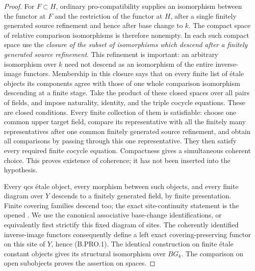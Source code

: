 \documentclass[11pt,a4paper]{article}
\begin{document}
\begin{proof}
For \(F\subset H\), ordinary pro-compatibility supplies an
isomorphism between the functor at \(F\) and the restriction of
the functor at \(H\), after a single finitely generated source
refinement and hence after base change to \(k\). The compact
space of relative comparison isomorphisms is therefore nonempty.
In each such compact space use the \emph{closure of the subset
of isomorphisms which descend after a finitely generated source
refinement}. This refinement is important: an arbitrary isomorphism
over \(k\) need not descend as an isomorphism of the entire
inverse-image functors. Membership in this closure says that on
every finite list of étale objects its components agree with those
of one whole comparison isomorphism descending at a finite stage.
Take the product of these closed spaces over all pairs of fields, and
impose naturality, identity, and the triple cocycle equations.
These are closed conditions. Every finite collection of them is
satisfiable: choose one common upper target field, compare its
representative with all the finitely many representatives after
one common finitely generated source refinement, and obtain all
comparisons by passing through this one representative. They
then satisfy every required finite cocycle equation. Compactness
gives a simultaneous coherent choice. This proves existence of
coherence; it has not been inserted into the hypothesis.

Every qcs étale object, every morphism between such objects, and
every finite diagram over \(Y\) descends to a finitely generated
field, by finite presentation. Finite covering families descend
too; the exact site-continuity statement is the opened
\citep[Lemma~59.51.2, Tag~0EYL, together with
Lemma~32.10.1, Tag~01ZM]{StacksProject}. We use the canonical
associative base-change identifications, or equivalently first
strictify this fixed diagram of sites. The coherently identified
inverse-image functors consequently
define a left exact covering-preserving functor on this site of
\(Y\), hence (B.PRO.1). The identical construction on finite étale
constant objects gives its structural isomorphism over \(BG_k\).
The comparison on open subobjects proves the assertion on spaces.


\end{proof}
\end{document}
